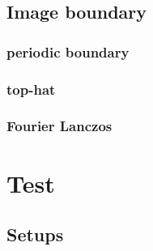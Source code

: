\documentclass[a4paper,fleqn,usenatbib]{mnras}
\begin{document}
\subsection{Image boundary}
\label{sec:Method-boundary}

\subsubsection{periodic boundary}



\subsubsection{top-hat}


\subsubsection{Fourier Lanczos}




\section{Test}
\label{sec:Test}

\subsection{Setups}
\label{sec:Test-setup}
\end{document}

